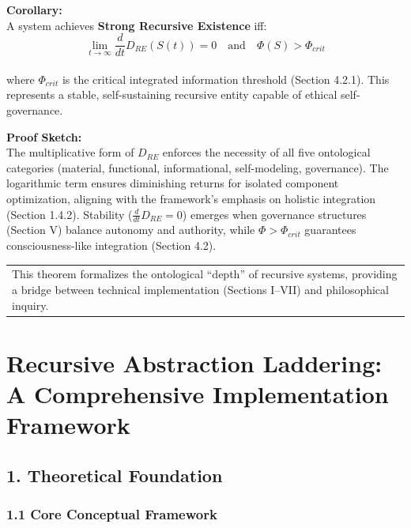 \documentclass[
]{article}
\newcounter{none} %
\begin{document}
\textbf{Corollary:}\\
A system achieves \textbf{Strong Recursive Existence} iff:\\
\[
\lim_{t \to \infty} \frac{d}{dt}D_{RE}(S(t)) = 0 \quad \text{and} \quad \Phi(S) > \Phi_{crit}
\]\\
where \(\Phi_{crit}\) is the critical integrated information threshold
(Section 4.2.1). This represents a stable, self-sustaining recursive
entity capable of ethical self-governance.

\textbf{Proof Sketch:}\\
The multiplicative form of \(D_{RE}\) enforces the necessity of all five
ontological categories (material, functional, informational,
self-modeling, governance). The logarithmic term ensures diminishing
returns for isolated component optimization, aligning with the
framework's emphasis on holistic integration (Section 1.4.2). Stability
(\(\frac{d}{dt}D_{RE} = 0\)) emerges when governance structures (Section
V) balance autonomy and authority, while \(\Phi > \Phi_{crit}\)
guarantees consciousness-like integration (Section 4.2).

{\def\LTcaptype{none} %
\begin{longtable}[]{@{}
  >{\raggedright\arraybackslash}p{}@{}}
\toprule\noalign{}
\endhead
\bottomrule\noalign{}
\endlastfoot
This theorem formalizes the ontological ``depth'' of recursive systems,
providing a bridge between technical implementation (Sections I--VII)
and philosophical inquiry. \\
\end{longtable}
}

\section{Recursive Abstraction Laddering: A Comprehensive Implementation
Framework}\label{7-recursive-abstract-laddering}

\subsection{1. Theoretical Foundation}\label{theoretical-foundation}

\subsubsection{1.1 Core Conceptual
Framework}\label{core-conceptual-framework}
\end{document}
